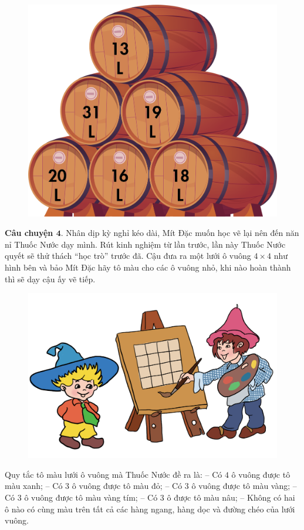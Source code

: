 		\begin{figure}[H]
		\centering
		\vspace*{-5pt}
		\captionsetup{labelformat= empty, justification=centering}
		\includegraphics[width=0.4\linewidth]{Hinh5}
		\vspace*{-10pt}
	\end{figure}
	\textbf{\color{toancuabi}Câu chuyện $\pmb{4.}$} Nhân dịp kỳ nghỉ kéo dài, Mít Đặc muốn học vẽ lại nên đến năn nỉ Thuốc Nước dạy mình. Rút kinh nghiệm từ lần trước, lần này Thuốc Nước quyết sẽ thử thách “học trò” trước đã. Cậu đưa ra một lưới ô vuông $4\times 4$ như hình bên và bảo Mít Đặc hãy tô màu cho các ô vuông nhỏ, khi nào hoàn thành thì sẽ dạy cậu ấy vẽ tiếp.
	\begin{figure}[H]
		\centering
		\vspace*{-5pt}
		\captionsetup{labelformat= empty, justification=centering}
		\includegraphics[width=0.6\linewidth]{Hinh6_Mit_dac_Thuoc_nuoc}
		\vspace*{-10pt}
	\end{figure}
	Quy tắc tô màu lưới ô vuông mà Thuốc Nước đề ra là:
	\vskip 0.1cm
	-- Có $4$ ô vuông được tô màu xanh;
	\vskip 0.1cm
	-- Có $3$ ô vuông được tô màu đỏ;
	\vskip 0.1cm
	-- Có $3$ ô vuông được tô màu vàng;
	\vskip 0.1cm
	-- Có $3$ ô vuông được tô màu vàng tím;
	\vskip 0.1cm
	-- Có $3$ ô được tô màu nâu;
	\vskip 0.1cm
	-- Không có hai ô nào có cùng màu trên tất cả các hàng ngang,
	hàng dọc và đường chéo của lưới vuông.

